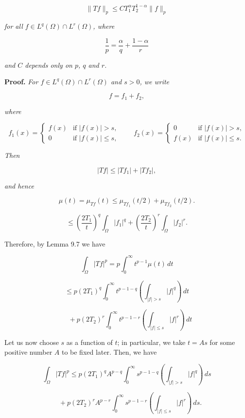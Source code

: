 \begin{equation}\tag{9.25}
\|Tf\|_p \le C T_1^{\alpha} T_2^{1-\alpha} \|f\|_p
\end{equation}

\emph{for all $f \in L^q(\Omega)\cap L^r(\Omega)$, where}

\[
\frac{1}{p} = \frac{\alpha}{q} + \frac{1-\alpha}{r}
\]

\emph{and $C$ depends only on $p$, $q$ and $r$.}

\textbf{Proof.} \emph{For $f \in L^q(\Omega)\cap L^r(\Omega)$ and $s > 0$, we write}

\[
f = f_1 + f_2,
\]

\emph{where}

\[
f_1(x)=\begin{cases}
f(x) & \text{if } |f(x)| > s,\\
0 & \text{if } |f(x)| \le s,
\end{cases}
\qquad
f_2(x)=\begin{cases}
0 & \text{if } |f(x)| > s,\\
f(x) & \text{if } |f(x)| \le s.
\end{cases}
\]

\emph{Then}

\[
|Tf| \le |Tf_1| + |Tf_2|,
\]

\emph{and hence}

\[
\mu(t)=\mu_{Tf}(t) \le \mu_{Tf_1}(t/2)+\mu_{Tf_2}(t/2).
\]

\[
\le \left(\frac{2T_1}{t}\right)^q \int_{\Omega} |f_1|^q + \left(\frac{2T_2}{t}\right)^r \int_{\Omega} |f_2|^r.
\]



Therefore, by Lemma 9.7 we have

\[
\int_{\Omega} |Tf|^p = p \int_0^{\infty} t^{p-1}\mu(t)\,dt
\]

\[
\leq p(2T_1)^q \int_0^{\infty} t^{p-1-q}
\left(\int_{|f|>s} |f|^q\right)\,dt
\]

\[
\quad + p(2T_2)^r \int_0^{\infty} t^{p-1-r}
\left(\int_{|f|\leq s} |f|^r\right)\,dt
\]

Let us now choose $s$ as a function of $t$; in particular, we take $t = As$ for some positive number $A$ to be fixed later. Then, we have

\[
\int_{\Omega} |Tf|^p \leq p(2T_1)^q A^{p-q} \int_0^{\infty} s^{p-1-q}
\left(\int_{|f|>s} |f|^q\right)\,ds
\]

\[
\quad + p(2T_2)^r A^{p-r} \int_0^{\infty} s^{p-1-r}
\left(\int_{|f|\leq s} |f|^r\right)\,ds.
\]

